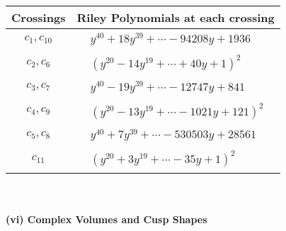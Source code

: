\documentclass[1p]{elsarticle_modified}
\theoremstyle{definition}
\begin{document}
\begin{tabular}{m{50pt}|m{274pt}}
Crossings & \hspace{64pt}Riley Polynomials at each crossing \\
\hline $$\begin{aligned}c_{1},c_{10}\end{aligned}$$&$\begin{aligned}
&y^{40}+18 y^{39}+\cdots-94208 y+1936
\end{aligned}$\\
\hline $$\begin{aligned}c_{2},c_{6}\end{aligned}$$&$\begin{aligned}
&(y^{20}-14 y^{19}+\cdots+40 y+1)^{2}
\end{aligned}$\\
\hline $$\begin{aligned}c_{3},c_{7}\end{aligned}$$&$\begin{aligned}
&y^{40}-19 y^{39}+\cdots-12747 y+841
\end{aligned}$\\
\hline $$\begin{aligned}c_{4},c_{9}\end{aligned}$$&$\begin{aligned}
&(y^{20}-13 y^{19}+\cdots-1021 y+121)^{2}
\end{aligned}$\\
\hline $$\begin{aligned}c_{5},c_{8}\end{aligned}$$&$\begin{aligned}
&y^{40}+7 y^{39}+\cdots-530503 y+28561
\end{aligned}$\\
\hline $$\begin{aligned}c_{11}\end{aligned}$$&$\begin{aligned}
&(y^{20}+3 y^{19}+\cdots-35 y+1)^{2}
\end{aligned}$\\
\hline
\end{tabular}\\~\\
\newpage\flushleft \textbf{(vi) Complex Volumes and Cusp Shapes}
\end{document}
